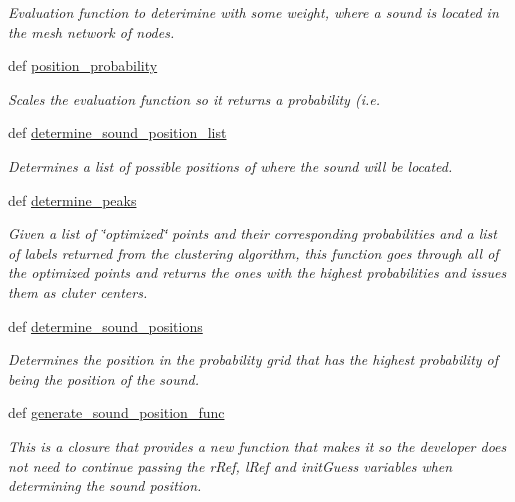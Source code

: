 \begin{DoxyCompactItemize}
\begin{DoxyCompactList}\small\item\em Evaluation function to deterimine with some weight, where a sound is located in the mesh network of nodes. \end{DoxyCompactList}\item 
def \hyperlink{namespacelocaudio_1_1triangulation_ab85ddfec0f2c6c1c20134d90a6fe874a}{position\-\_\-probability}
\begin{DoxyCompactList}\small\item\em Scales the evaluation function so it returns a probability (i.\-e. \end{DoxyCompactList}\item 
def \hyperlink{namespacelocaudio_1_1triangulation_ad01abd5ed08c05988dea7978b141549c}{determine\-\_\-sound\-\_\-position\-\_\-list}
\begin{DoxyCompactList}\small\item\em Determines a list of possible positions of where the sound will be located. \end{DoxyCompactList}\item 
def \hyperlink{namespacelocaudio_1_1triangulation_aaf881f389e42011e1bacc2247794cc7d}{determine\-\_\-peaks}
\begin{DoxyCompactList}\small\item\em Given a list of \char`\"{}optimized\char`\"{} points and their corresponding probabilities and a list of labels returned from the clustering algorithm, this function goes through all of the optimized points and returns the ones with the highest probabilities and issues them as cluter centers. \end{DoxyCompactList}\item 
def \hyperlink{namespacelocaudio_1_1triangulation_a37420560e73cb3aefbdff181774725be}{determine\-\_\-sound\-\_\-positions}
\begin{DoxyCompactList}\small\item\em Determines the position in the probability grid that has the highest probability of being the position of the sound. \end{DoxyCompactList}\item 
def \hyperlink{namespacelocaudio_1_1triangulation_a91ab07f598b1161238e199e127fef855}{generate\-\_\-sound\-\_\-position\-\_\-func}
\begin{DoxyCompactList}\small\item\em This is a closure that provides a new function that makes it so the developer does not need to continue passing the r\-Ref, l\-Ref and init\-Guess variables when determining the sound position. \end{DoxyCompactList}\end{DoxyCompactItemize}
